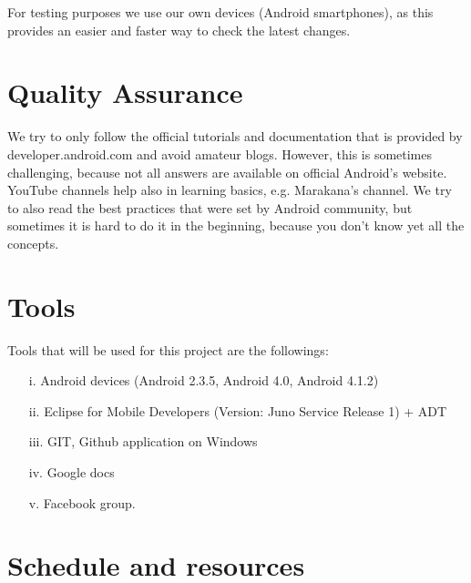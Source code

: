 \documentclass[10pt,a4paper]{report}
\begin{document}
For testing purposes we use our own devices (Android smartphones), as this provides an easier and faster way to check the latest changes.

\section{Quality Assurance}

We try to only follow the official tutorials and documentation that is provided by developer.android.com and avoid amateur blogs. However, this is sometimes challenging, because not all answers are available on official Android’s website. YouTube channels help also in learning basics, e.g. Marakana’s channel. We try to also read the best practices that were set by Android community, but sometimes it is hard to do it in the beginning, because you don’t know yet all the concepts.

\section{Tools}
Tools that will be used for this project are the followings: 
\begin{itemize}
\item[i.] Android devices (Android 2.3.5, Android 4.0, Android 4.1.2)
\item[ii.] Eclipse for Mobile Developers (Version: Juno Service Release 1)  + ADT
\item[iii.] GIT, Github application on Windows
\item[iv.] Google docs             	
\item[v.] Facebook group. 

\end{itemize}
\pagebreak

\section{Schedule and resources}
\end{document}
